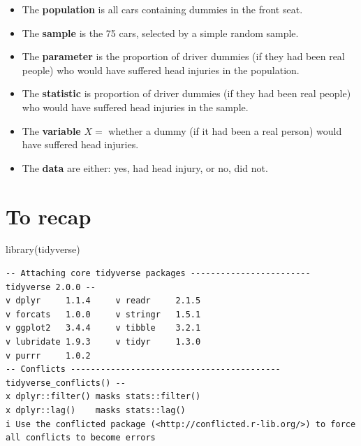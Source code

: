 \documentclass[
  letterpaper,
  DIV=11,
  numbers=noendperiod]{scrreprt}
\newenvironment{Shaded}{\begin{snugshade}}{\end{snugshade}}
\newcommand{\FunctionTok}[1]{\textcolor[rgb]{0.28,0.35,0.67}{#1}}
\newcommand{\NormalTok}[1]{\textcolor[rgb]{0.00,0.23,0.31}{#1}}
\providecommand{\tightlist}{%
  \setlength{\itemsep}{0pt}\setlength{\parskip}{0pt}}\usepackage{longtable,booktabs,array}
\begin{document}
\begin{tcolorbox}[enhanced jigsaw, colframe=quarto-callout-tip-color-frame, bottomtitle=1mm, colbacktitle=quarto-callout-tip-color!10!white, bottomrule=.15mm, toprule=.15mm, breakable, leftrule=.75mm, left=2mm, rightrule=.15mm, colback=white, opacityback=0, opacitybacktitle=0.6, toptitle=1mm, titlerule=0mm, title=\textcolor{quarto-callout-tip-color}{\faLightbulb}\hspace{0.5em}{Solution}, arc=.35mm, coltitle=black]

\begin{itemize}
\tightlist
\item
  The \textbf{population} is all cars containing dummies in the front
  seat.
\item
  The \textbf{sample} is the 75 cars, selected by a simple random
  sample.
\item
  The \textbf{parameter} is the proportion of driver dummies (if they
  had been real people) who would have suffered head injuries in the
  population.
\item
  The \textbf{statistic} is proportion of driver dummies (if they had
  been real people) who would have suffered head injuries in the sample.
\item
  The \textbf{variable} \(X =\) whether a dummy (if it had been a real
  person) would have suffered head injuries.
\item
  The \textbf{data} are either: yes, had head injury, or no, did not.
\end{itemize}

\end{tcolorbox}

\section{To recap}\label{to-recap}

\begin{Shaded}
\begin{Highlighting}[]
\FunctionTok{library}\NormalTok{(tidyverse)}
\end{Highlighting}
\end{Shaded}

\begin{verbatim}
-- Attaching core tidyverse packages ------------------------ tidyverse 2.0.0 --
v dplyr     1.1.4     v readr     2.1.5
v forcats   1.0.0     v stringr   1.5.1
v ggplot2   3.4.4     v tibble    3.2.1
v lubridate 1.9.3     v tidyr     1.3.0
v purrr     1.0.2     
-- Conflicts ------------------------------------------ tidyverse_conflicts() --
x dplyr::filter() masks stats::filter()
x dplyr::lag()    masks stats::lag()
i Use the conflicted package (<http://conflicted.r-lib.org/>) to force all conflicts to become errors
\end{verbatim}
\end{document}
